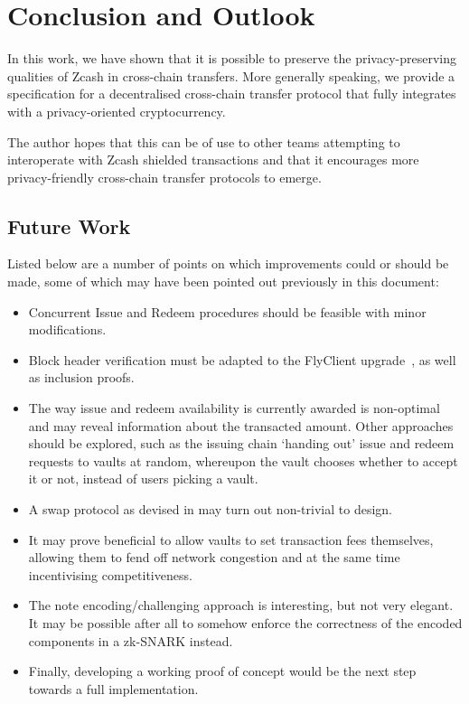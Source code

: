 
\chapter{Conclusion and Outlook}

In this work, we have shown that it is possible to preserve the privacy-preserving qualities of Zcash in cross-chain transfers.
More generally speaking, we provide a specification for a decentralised cross-chain transfer protocol that fully integrates with a privacy-oriented cryptocurrency.

The author hopes that this can be of use to other teams attempting to interoperate with Zcash shielded transactions and that it encourages more privacy-friendly cross-chain transfer protocols to emerge.


\section{Future Work}

Listed below are a number of points on which improvements could or should be made, some of which may have been pointed out previously in this document:
\begin{itemize}
    \item Concurrent Issue and Redeem procedures should be feasible with minor modifications.
    \item Block header verification must be adapted to the FlyClient upgrade~\cite{zipszip0221flyclient}, as well as inclusion proofs.
    \item The way issue and redeem availability is currently awarded is non-optimal and may reveal information about the transacted amount.
    Other approaches should be explored, such as the issuing chain `handing out' issue and redeem requests to vaults at random, whereupon the vault chooses whether to accept it or not, instead of users picking a vault.
    \item A swap protocol as devised in \xclaim may turn out non-trivial to design.
    \item It may prove beneficial to allow vaults to set transaction fees themselves, allowing them to fend off network congestion and at the same time incentivising competitiveness.
    \item The note encoding/challenging approach is interesting, but not very elegant.
    It may be possible after all to somehow enforce the correctness of the encoded components in a zk-SNARK instead.
    \item Finally, developing a working proof of concept would be the next step towards a full implementation.
\end{itemize}

